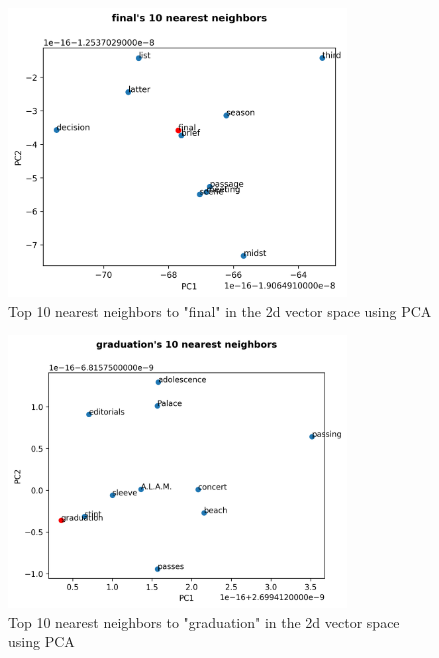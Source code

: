 \documentclass[12pt,letterpaper]{article}
\begin{document}
\begin{figure}[H]
\begin{center}
  \includegraphics[width=0.8\textwidth]{../graphs/final_neighbors.png}
\end{center}
\caption{Top 10 nearest neighbors to "final" in the 2d vector space using PCA}
\end{figure}

\begin{figure}[H]
\begin{center}
  \includegraphics[width=0.8\textwidth]{../graphs/graduation_neighbors.png}
\end{center}
\caption{Top 10 nearest neighbors to "graduation" in the 2d vector space using PCA}
\end{figure}
\end{document}
